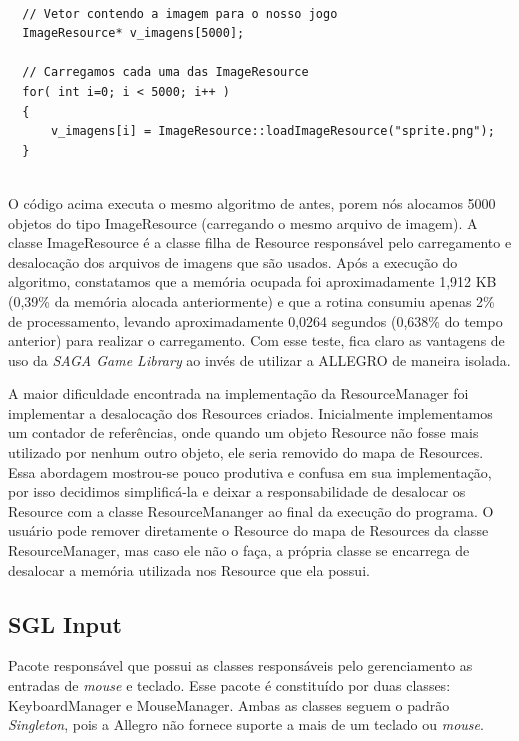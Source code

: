 %
%
\begin{lstlisting}

  // Vetor contendo a imagem para o nosso jogo
  ImageResource* v_imagens[5000];
	
  // Carregamos cada uma das ImageResource
  for( int i=0; i < 5000; i++ )
  {
      v_imagens[i] = ImageResource::loadImageResource("sprite.png");
  }
	      
\end{lstlisting}
%
\par O código acima executa o mesmo algoritmo de antes, porem nós alocamos 5000 objetos do tipo ImageResource (carregando o mesmo arquivo de imagem). A classe ImageResource é a classe filha de Resource responsável pelo carregamento e desalocação dos arquivos de imagens que são usados. Após a execução do algoritmo, constatamos que a memória ocupada foi aproximadamente 1,912 KB (0,39\% da memória alocada anteriormente) e que a rotina consumiu apenas 2\% de processamento, levando aproximadamente 0,0264 segundos (0,638\% do tempo anterior) para realizar o carregamento. Com esse teste, fica claro as vantagens de uso da \textit{SAGA Game Library} ao invés de utilizar a ALLEGRO de maneira isolada.
\par
A maior dificuldade encontrada na implementação da ResourceManager foi implementar a desalocação dos Resources criados. Inicialmente implementamos um contador de referências, onde quando um objeto Resource não fosse mais utilizado por nenhum outro objeto, ele seria removido do mapa de Resources. Essa abordagem mostrou-se pouco produtiva e confusa em sua implementação, por isso decidimos simplificá-la e deixar a responsabilidade de desalocar os Resource com a classe ResourceMananger ao final da execução do programa. O usuário pode remover diretamente o Resource do mapa de Resources da classe ResourceManager, mas caso ele não o faça, a própria classe se encarrega de desalocar a memória utilizada nos Resource que ela possui.
%
%
%
\subsection{SGL Input}
%
%
Pacote responsável que possui as classes responsáveis pelo gerenciamento as entradas de \textit{mouse} e teclado. Esse pacote é constituído por duas classes: KeyboardManager e MouseManager. Ambas as classes seguem o padrão \textit{Singleton}, pois a Allegro não fornece suporte a mais de um teclado ou \textit{mouse}.
%
%
